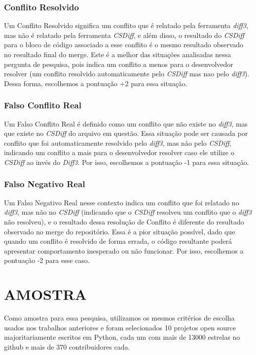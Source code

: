 \subsubsection{Conflito Resolvido}
Um Conflito Resolvido significa um conflito que é relatado pela ferramenta \emph{diff3},
mas não é relatado pela ferramenta \emph{CSDiff}, e
além disso, o resultado do \emph{CSDiff} para o bloco de código associado a esse conflito é o mesmo resultado
observado no resultado
final do merge. Este é a melhor das situações analisadas nessa pergunta de pesquisa, pois indica um conflito a menos para o
desenvolvedor resolver (um conflito resolvido automaticamente pelo \emph{CSDiff} mas nao pelo \emph{diff3}). Dessa forma,
escolhemos a pontuação +2 para essa situação.
\subsubsection{Falso Conflito Real}
Um Falso Conflito Real é definido como um conflito que não existe
no \emph{diff3}, mas que existe no \emph{CSDiff} do arquivo em questão. Essa
situação pode ser causada por conflito que foi automaticamente
resolvido pelo \emph{diff3}, mas não pelo \emph{CSDiff}, indicando um conflito
a mais para o desenvolvedor resolver caso ele utilize o \emph{CSDiff}
ao invés do \emph{Diff3}. Por isso, escolhemos a pontuação -1 para essa
situação.
\subsubsection{Falso Negativo Real}
Um Falso Negativo Real nesse contexto indica um conflito que foi relatado no
\emph{diff3}, mas não no \emph{CSDiff} (indicando que
o \emph{CSDiff} resolveu um conflito que o \emph{diff3} não resolveu),
e o resultado dessa resolução de Conflito é diferente do resultado
observado no merge do repositório. Essa é a pior situação possível,
dado que quando um conflito é resolvido de forma errada,
o código resultante poderá apresentar comportamento inesperado ou não funcionar. Por
isso, escolhemos a pontuação -2 para esse caso.

\section{AMOSTRA}
Como amostra para essa pesquisa, utilizamos os mesmos critérios de escolha
usados nos trabalhos anteriores e foram selecionados 10 projetos open source majoritariamente escritos em Python,
cada um com mais de 13000 estrelas no github e mais de 370 contribuidores cada.

